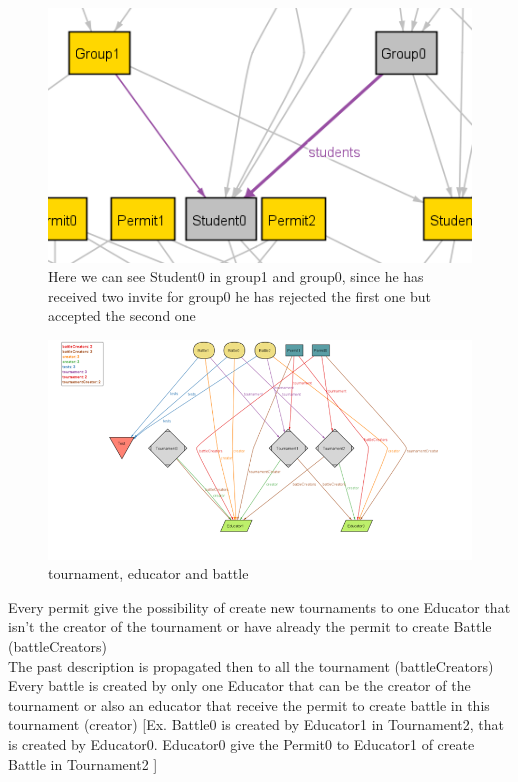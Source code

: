 \documentclass{article}
\begin{document}
{\begin{figure}[H]
    \centering
    \includegraphics{images/ALLOY/students.png}
    \caption{Here we can see Student0 in group1 and group0, since he has received two invite for group0 he has rejected the first one but accepted the second one}
    \label{fig:receivingAcceptingRefusingInvite}
\end{figure}
\begin{figure}[H]
    \centering
    \hspace*{-3cm}\includegraphics[scale=1.3]{images/ALLOY/Picture2.png}
    \caption{tournament, educator and battle}
    \label{fig:tournament, educator and battle}
\end{figure}
\color{red}
Every permit give the possibility of create new tournaments to one Educator that isn't the creator of the tournament or have already the permit to create Battle (battleCreators)\\
\color{brown}
The past description is propagated then to all the tournament (battleCreators)\\
\color{orange}
Every battle is created by only one Educator that can be the creator of the tournament or also an educator that receive the permit to create battle in this tournament (creator) [Ex. Battle0 is created by Educator1 in Tournament2, that is created by Educator0. Educator0 give the Permit0 to Educator1 of create Battle in Tournament2 ]\\
}
\end{document}
